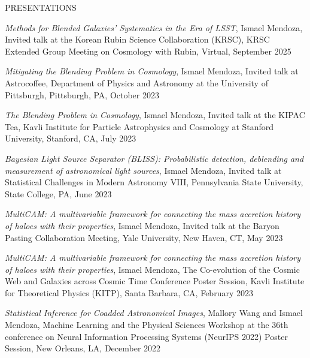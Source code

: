 \documentclass{resume} %
\begin{document}
\begin{rSection}{PRESENTATIONS}
%
\vspace*{-1em}

\item \textit{Methods for Blended Galaxies’ Systematics in the Era of LSST}, Ismael Mendoza, Invited talk at the Korean Rubin Science Collaboration (KRSC), KRSC Extended Group Meeting on Cosmology with Rubin, Virtual, September 2025

\item \textit{Mitigating the Blending Problem in Cosmology}, Ismael Mendoza, Invited talk at Astrocoffee, Department of Physics and Astronomy at the University of Pittsburgh, Pittsburgh, PA, October 2023

\item \textit{The Blending Problem in Cosmology}, Ismael Mendoza, Invited talk at the KIPAC Tea, Kavli Institute for Particle Astrophysics and Cosmology at Stanford University, Stanford, CA, July 2023

\item \textit{Bayesian Light Source Separator (BLISS): Probabilistic detection, deblending and measurement of astronomical light sources}, Ismael Mendoza, Invited talk at Statistical Challenges in Modern Astronomy VIII, Pennsylvania State University, State College, PA, June 2023

\item \textit{MultiCAM: A multivariable framework for connecting the mass accretion history of haloes with their properties}, Ismael Mendoza, Invited talk at the Baryon Pasting Collaboration Meeting, Yale University, New Haven, CT, May 2023

\item \textit{MultiCAM: A multivariable framework for connecting the mass accretion history of haloes with their properties}, Ismael Mendoza, The Co-evolution of the Cosmic Web and Galaxies across Cosmic Time Conference Poster Session, Kavli Institute for Theoretical Physics (KITP), Santa Barbara, CA, February 2023

\item \textit{Statistical Inference for Coadded Astronomical Images}, Mallory Wang and Ismael Mendoza, Machine Learning and the Physical Sciences Workshop at the 36th conference on Neural Information Processing Systems (NeurIPS 2022) Poster Session, New Orleans, LA, December 2022


\end{rSection}
\end{document}
